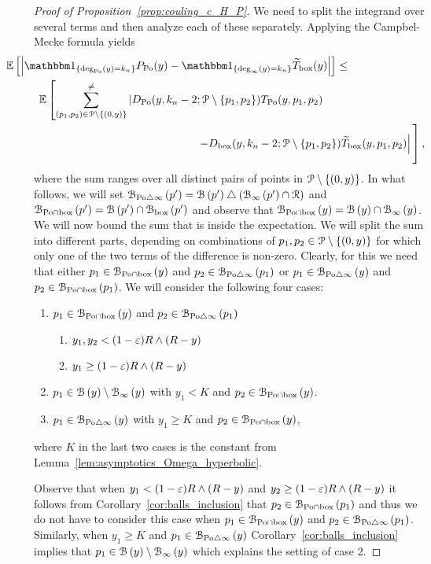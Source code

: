 \begin{proof}[Proof of Proposition~\ref{prop:couling_c_H_P}]
We need to split the integrand over several terms and then analyze each of these separately. Applying the Campbel-Mecke formula yields
\begin{align*} 
 &\hspace{-30pt}\Exp{ \left| \ind{\mathrm{deg}_{\Po}(y) = k_n} P_{\Po}(y)
        - \ind{\mathrm{deg}_{\infty}(y) = k_n}  \widetilde{T}_{\mathrm{box}}(y)
        \right|}\leq \\
 & {\mathbb E} \left[ \sum_{(p_1,p_2) \in \Pcal \setminus \{(0,y)\}}^{\not =} 
  \left| D_{\Po}(y,k_n-2; \Pcal \setminus \{p_1,p_2 \}) T_{\Po}(y,p_1,p_2) \right. \right.\\
  & \hspace{5cm} 
\left. \left. - D_{\text{box}} (y,k_n-2;\Pcal \setminus \{p_1,p_2\}) \widetilde{T}_{\text{box}}(y,p_1,p_2)
   \right| \vphantom{\sum_{p_1,p_2 \in \Pcal \setminus \{(0,y)\}}^{\not =}}\right],
\end{align*}
where the sum ranges over all distinct pairs of points in ${\mathcal P} \setminus \{ (0,y)\}$. In what follows, we will set ${\mathcal B}_{{\mathrm{Po}} \bigtriangleup \infty}\left(p'\right) = {\mathcal B}\left(p'\right) \bigtriangleup ({\mathcal B}_{\infty}\left(p'\right) \cap {\mathcal R})$ and ${\mathcal B}_{{\mathrm{Po}} \cap \text{box}}\left(p'\right) ={\mathcal B}\left(p'\right) \cap {\mathcal B}_{\text{box}}\left(p'\right)$ and observe that ${\mathcal B}_{{\mathrm{Po}} \cap \text{box}}\left(y\right) = {\mathcal B}\left(y\right) \cap {\mathcal B}_{\infty}\left(y\right)$. We will now bound the sum that is inside the expectation.
We will split the sum into different parts, depending on combinations of $p_1, p_2\in {\mathcal P} \setminus \{(0,y)\}$ for which only one of the two terms of the difference is non-zero. Clearly, for this we need that either $p_1 \in {\mathcal B}_{{\mathrm{Po}} \cap \text{box}}\left(y\right)$ and $p_2 \in {\mathcal B}_{{\mathrm{Po}} \bigtriangleup \infty}\left(p_1\right)$ or $p_1 \in {\mathcal B}_{{\mathrm{Po}} \bigtriangleup \infty}\left(y\right)$ and $p_2 \in {\mathcal B}_{{\mathrm{Po}} \cap \text{box}}\left(p_1\right)$. We will consider the following four cases:
\begin{enumerate}
\item$p_1 \in {\mathcal B}_{{\mathrm{Po}} \cap \text{box}}\left(y\right)$ and $p_2 \in {\mathcal B}_{{\mathrm{Po}} \bigtriangleup \infty}\left(p_1\right)$
\begin{enumerate}
\item $y_1,y_2 < (1-\varepsilon ) R \wedge (R-y)$
\item $y_1 \ge (1-\varepsilon ) R \wedge (R-y)$
\end{enumerate}
\item$p_1 \in {\mathcal B}\left(y\right) \setminus {\mathcal B}_{\infty}\left(y\right)$ with $y_1 < K$ and $p_2 \in {\mathcal B}_{{\mathrm{Po}} \cap \text{box}}\left(y\right)$.
\item $p_1 \in {\mathcal B}_{{\mathrm{Po}} \bigtriangleup \infty}\left(y\right)$ with $y_1 \ge K$ and $p_2 \in {\mathcal B}_{{\mathrm{Po}} \cap \text{box}}\left(y\right)$,
\end{enumerate}
where $K$ in the last two cases is the constant from Lemma~\ref{lem:asymptotics_Omega_hyperbolic}.

Observe that when $y_1 < (1-\varepsilon ) R \wedge (R-y)$ and $y_2 \ge (1-\varepsilon ) R \wedge (R-y)$ it follows from Corollary~\ref{cor:balls_inclusion} that $p_2 \in {\mathcal B}_{{\mathrm{Po}} \cap \text{box}}\left(p_1\right)$ and thus we do not have to consider this case when $p_1 \in {\mathcal B}_{{\mathrm{Po}} \cap \text{box}}\left(y\right)$ and $p_2 \in {\mathcal B}_{{\mathrm{Po}} \bigtriangleup \infty}\left(p_1\right)$. Similarly, when $y_1 \ge K$ and $p_1 \in {\mathcal B}_{{\mathrm{Po}} \bigtriangleup \infty}\left(y\right)$ Corollary~\ref{cor:balls_inclusion} implies that $p_1 \in {\mathcal B}\left(y\right) \setminus {\mathcal B}_{\infty}\left(y\right)$ which explains the setting of case 2.


\end{proof}
